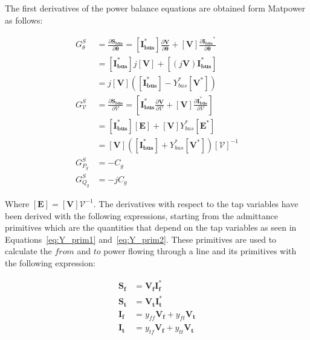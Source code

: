 The first derivatives of the power balance equations are obtained form Matpower \cite{zimmermanTN2} as follows:

\begin{equation}
    \begin{split}
        G^S_\theta &= \frac{\partial \bm{S_{bus}}}{\partial \bm{\theta}} = [\bm{I_{bus}^*}] \frac{\partial \bm{V}}{\partial \bm{\theta}} + [\bm{V}] \frac{\partial \bm{I_{bus}}^*}{\partial \bm{\theta}} \\
        &= \left[ \bm{I_{bus}^*} \right] j [\bm{V}] + \left[ (j \bm{V}) \bm{I_{bus}^*} \right] \\
        &= j [\bm{V}] \left( [\bm{I_{bus}^*}] - Y_{bus}^* [\bm{V^*}] \right) \\
        G^S_{\mathcal{V}} &= \frac{\partial \bm{S_{bus}}}{\partial \bm{\mathcal{V}}} = \left[ \bm{I_{bus}^*} \frac{\partial \bm{V}}{\partial \bm{\mathcal{V}}} + [\bm{V}] \frac{\partial \bm{I_{bus}^*}}{\partial \bm{\mathcal{V}}} \right] \\
        &= \left[ \bm{I_{bus}^*} \right] [\bm{E}] + [\bm{V}] Y_{bus}^* [\bm{E^*}] \\
        &= [\bm{V}] ([\bm{I_{bus}^*}] + Y_{bus}^* [\bm{V^*}]) [\bm{\mathcal{V}}]^{-1}  \\
        G^S_{P_g} &= - C_g \\
        G^S_{Q_g} &= - jC_g
    \end{split}
\end{equation}

Where $ [\bm{E}] = [\bm{V}]\bm{\mathcal{V}}^{-1}$. The derivatives with respect to the tap variables have been derived with the following expressions, starting from the admittance primitives which are the quantities that
depend on the tap variables as seen in Equations~\eqref{eq:Y_prim1} and~\eqref{eq:Y_prim2}. These primitives are used to calculate the $from$ and $to$ power flowing through a line and its primitives with the following expression:

\begin{equation}
\begin{split}
    \bm{S_f} &= \bm{V_f I_f^*}\\
    \bm{S_t} &= \bm{V_t I_t^*}\\
    \bm{I_f} &= y_{ff} \bm{V_f} + y_{ft} \bm{V_t}\\
    \bm{I_t} &= y_{tf} \bm{V_f} + y_{tt} \bm{V_t}\\
\end{split}
\end{equation}

